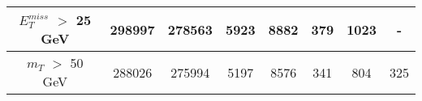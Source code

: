 \documentclass[10pt]{article}
\begin{document}
\begin{center}
\begin{table}[H]
\begin{adjustbox}{width=1\textwidth}
\begin{tabular}{cccccccc}
\multicolumn{1}{|c|}{$E_{T}^{miss}$ $>$ 25 GeV}  & \multicolumn{1}{c|}{298997} & \multicolumn{1}{c|}{278563} & \multicolumn{1}{c|}{5923} & \multicolumn{1}{c|}{8882} & \multicolumn{1}{c|}{379} & \multicolumn{1}{c|}{1023} & \multicolumn{1}{c|}{-}  \\ \hline 
\multicolumn{1}{|c|}{$m_{T}$ $>$ 50 GeV}  & \multicolumn{1}{c|}{288026} & \multicolumn{1}{c|}{275994} & \multicolumn{1}{c|}{5197} & \multicolumn{1}{c|}{8576} & \multicolumn{1}{c|}{341} & \multicolumn{1}{c|}{804} & \multicolumn{1}{c|}{325}  \\ \hline 
\end{tabular} 										
\end{adjustbox}										
\end{table} 											
\end{center}											
\end{document}
